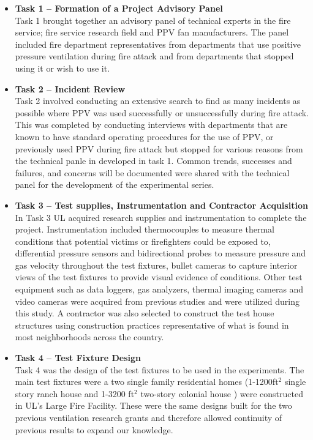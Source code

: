 \documentclass{article}
\begin{document}
\begin{itemize}
	\item \textbf{Task 1 – Formation of a Project Advisory Panel} \\ 
	Task 1 brought together an advisory panel of technical experts in the fire service; fire service research field and PPV fan manufacturers. The panel included fire department representatives from departments that use positive pressure ventilation during fire attack and from departments that stopped using it or wish to use it. 
	
	\item \textbf{Task 2 – Incident Review} \\
	Task 2 involved conducting an extensive search to find as many incidents as possible where PPV was used successfully or unsuccessfully during fire attack. This was completed by conducting interviews with departments that are known to have standard operating procedures for the use of PPV, or previously used PPV during fire attack but stopped for various reasons from the technical panle in developed in task 1. Common trends, successes and failures, and concerns will be documented were shared with the technical panel for the development of the experimental series. 
	
	\item \textbf{Task 3 – Test supplies, Instrumentation and Contractor Acquisition} \\
	In Task 3 UL acquired research supplies and instrumentation to complete the project. Instrumentation included thermocouples to measure thermal conditions that potential victims or firefighters could be exposed to, differential pressure sensors and bidirectional probes to measure pressure and gas velocity throughout the test fixtures, bullet cameras to capture interior views of the test fixtures to provide visual evidence of conditions. Other test equipment such as data loggers, gas analyzers, thermal imaging cameras and video cameras were acquired from previous studies and were utilized during this study. A contractor was also selected to construct the test house structures using construction practices representative of what is found in most neighborhoods across the country.
	
	\item \textbf{Task 4 – Test Fixture Design} \\
	Task 4 was the design of the test fixtures to be used in the experiments. The main test fixtures were a two single family residential homes (1-1200ft$^2$ single story ranch house and 1-3200 ft$^2$ two-story colonial house ) were constructed in UL’s Large Fire Facility. These were the same designs built for the two previous ventilation research grants and therefore allowed continuity of previous results to expand our knowledge.
	

\end{itemize}
\end{document}
